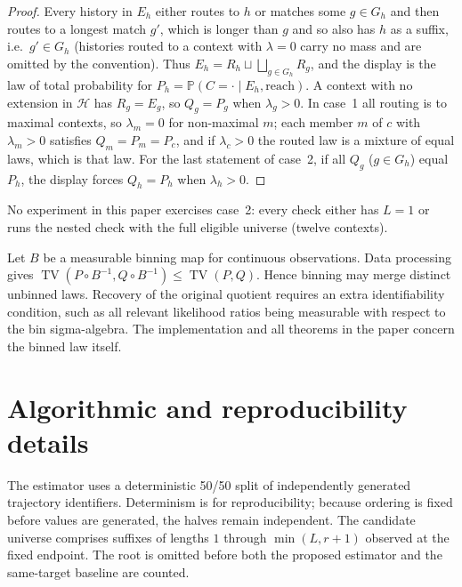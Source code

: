\documentclass{article}
\newcommand{\cH}{\mathcal H}
\newcommand{\Prb}{\mathbb P}
\DeclareMathOperator{\TV}{TV}
\begin{document}
\begin{proof}
Every history in $E_h$ either routes to $h$ or matches some $g\in G_h$ and then
routes to a longest match $g'$, which is longer than $g$ and so also has $h$
as a suffix, i.e.\ $g'\in G_h$ (histories routed to a context with
$\lambda=0$ carry no mass and are omitted by the convention).  Thus $E_h=R_h\sqcup\bigsqcup_{g\in G_h}R_g$,
and the display is the law of total probability for
$P_h=\Prb(C=\cdot\mid E_h,\text{reach})$.  A context with no extension in
$\cH$ has $R_g=E_g$, so $Q_g=P_g$ when $\lambda_g>0$.  In case~1 all routing
is to maximal contexts, so $\lambda_m=0$ for non-maximal $m$; each member $m$
of $c$ with $\lambda_m>0$ satisfies $Q_m=P_m=P_c$, and if $\lambda_c>0$ the
routed law is a mixture of equal laws, which is that law.  For the last statement of case~2, if all
$Q_g$ ($g\in G_h$) equal $P_h$, the display forces $Q_h=P_h$ when
$\lambda_h>0$.
\end{proof}

No experiment in this paper exercises case~2: every check either has $L=1$
or runs the nested check with the full eligible universe (twelve contexts).


Let $B$ be a measurable binning map for continuous observations.  Data
processing gives
$\TV(P\circ B^{-1},Q\circ B^{-1})\le\TV(P,Q)$.  Hence binning may merge
distinct unbinned laws.  Recovery of the original quotient requires an extra
identifiability condition, such as all relevant likelihood ratios being
measurable with respect to the bin sigma-algebra.  The implementation and all
theorems in the paper concern the binned law itself.

\section{Algorithmic and reproducibility details}

The estimator uses a deterministic 50/50 split of independently generated
trajectory identifiers.  Determinism is for reproducibility; because ordering
is fixed before values are generated, the halves remain independent.  The
candidate universe comprises suffixes of lengths $1$ through
$\min(L,r+1)$ observed at the fixed endpoint.  The root is omitted before both
the proposed estimator and the same-target baseline are counted.
\end{document}
